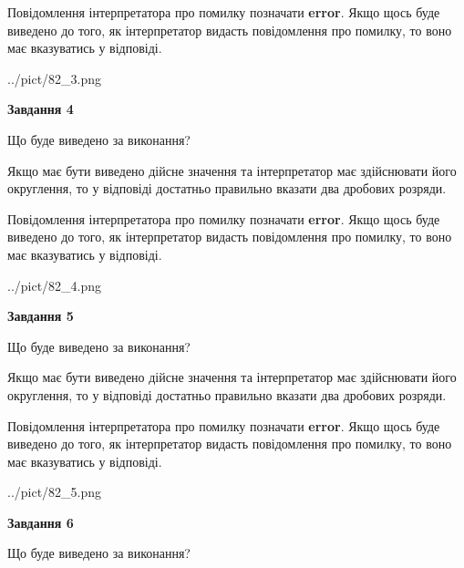 \documentclass[12pt, ukrainian]{article}
\begin{document}
{\begin {Large}
Повідомлення інтерпретатора про помилку позначати \textbf{error}.
Якщо щось буде виведено до того, як інтерпретатор видасть повідомлення про помилку, 
то воно має вказуватись у відповіді. \par

\begin{center}
	{../pict/82_3.png}
\end{center}
\newpage

{\begin {center}\textbf{Завдання 4}\end {center}}\par
Що буде виведено за виконання? \par

Якщо має бути виведено дійсне значення та інтерпретатор має здійснювати його округлення, 
то у відповіді достатньо правильно вказати два дробових розряди.

Повідомлення інтерпретатора про помилку позначати \textbf{error}.
Якщо щось буде виведено до того, як інтерпретатор видасть повідомлення про помилку, 
то воно має вказуватись у відповіді. \par

\begin{center}
	{../pict/82_4.png}
\end{center}
\newpage

{\begin {center}\textbf{Завдання 5}\end {center}}\par
Що буде виведено за виконання? \par

Якщо має бути виведено дійсне значення та інтерпретатор має здійснювати його округлення, 
то у відповіді достатньо правильно вказати два дробових розряди.

Повідомлення інтерпретатора про помилку позначати \textbf{error}.
Якщо щось буде виведено до того, як інтерпретатор видасть повідомлення про помилку, 
то воно має вказуватись у відповіді. \par

\begin{center}
	{../pict/82_5.png}
\end{center}
\newpage

{\begin {center}\textbf{Завдання 6}\end {center}}\par
Що буде виведено за виконання? \par


\end{Large}}
\end{document}
